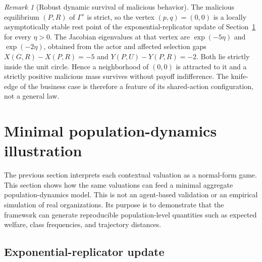 \documentclass[a4paper,fleqn]{cas-dc}
\theoremstyle{remark}
\newtheorem{remark}[definition]{Remark}
\begin{document}
\begin{remark}[Robust dynamic survival of malicious behavior]
\label{rem:diagonal-dynamics}
The malicious equilibrium $(P,R)$ of $\Gamma^\diamond$ is strict, so the vertex $(p,q)=(0,0)$ is a locally asymptotically stable rest point of the exponential-replicator update of Section~\ref{sec:simulation} for every $\eta>0$. The Jacobian eigenvalues at that vertex are $\exp(-5\eta)$ and $\exp(-2\eta)$, obtained from the actor and affected selection gaps $X(G,R)-X(P,R)=-5$ and $Y(P,U)-Y(P,R)=-2$. Both lie strictly inside the unit circle. Hence a neighborhood of $(0,0)$ is attracted to it and a strictly positive malicious mass survives without payoff indifference. The knife-edge of the business case is therefore a feature of its shared-action configuration, not a general law.
\end{remark}

\section{Minimal population-dynamics illustration}
\label{sec:simulation}

The previous section interprets each contextual valuation as a normal-form game. This section shows how the same valuations can feed a minimal aggregate population-dynamics model. This is not an agent-based validation or an empirical simulation of real organizations. Its purpose is to demonstrate that the framework can generate reproducible population-level quantities such as expected welfare, class frequencies, and trajectory distances.

\subsection{Exponential-replicator update}
\end{document}
